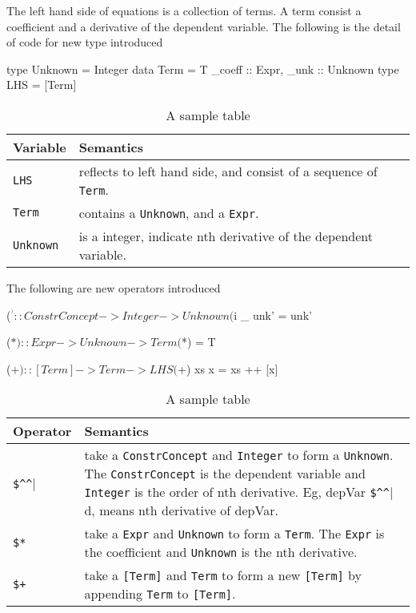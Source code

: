 The left hand side of equations is a collection of terms. A term consist a coefficient and a derivative of the dependent variable. The following is the detail of code for new type introduced

\begin{haskell1}
type Unknown = Integer
data Term = T{
	_coeff :: Expr,
	_unk :: Unknown
}
type LHS = [Term]
\end{haskell1}

\begin{table}
	\begin{tabular}{ p{} p{} }
		\textbf{Variable} & \textbf{Semantics} \\
		\toprule
		\verb|LHS| & reflects to left hand side, and consist of a sequence of \verb|Term|.\\
		\verb|Term| & contains a \verb|Unknown|, and a \verb|Expr|.\\
		\verb|Unknown| & is a integer, indicate nth derivative of the dependent variable.\\
		\bottomrule	
	\end{tabular}	
	\caption{A sample table}	
	\label{tab_inputtype}
\end{table}

The following are new operators introduced
\begin{haskell1}
($^^) :: ConstrConcept -> Integer -> Unknown
($^^) _ unk' = unk'

($*) :: Expr -> Unknown -> Term
($*) = T

($+) :: [Term] -> Term -> LHS
($+) xs x  = xs ++ [x]
\end{haskell1}

\begin{table}
	\begin{tabular}{ p{} p{} }
		\textbf{Operator} & \textbf{Semantics} \\
		\toprule
		\verb|$^^| & take a \verb|ConstrConcept| and \verb|Integer| to form a \verb|Unknown|. The \verb|ConstrConcept| is the dependent variable and \verb|Integer| is the order of nth derivative. Eg, depVar \verb|$^^| d, means nth derivative of depVar.\\
		\verb|$*| & take a \verb|Expr| and \verb|Unknown| to form a \verb|Term|. The \verb|Expr| is the coefficient and \verb|Unknown| is the nth derivative.\\
		\verb|$+| & take a \verb|[Term]| and \verb|Term| to form a new \verb|[Term]| by appending \verb|Term| to \verb|[Term]|.\\
		\bottomrule	
	\end{tabular}	
	\caption{A sample table}	
	\label{tab_inputtype}
\end{table}

